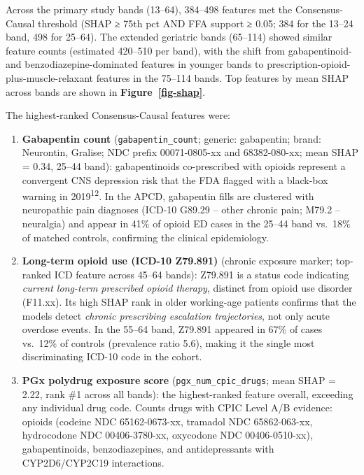 \documentclass[
  12pt,
]{book}
\begin{document}
Across the primary study bands (13--64), 384--498 features met the
Consensus-Causal threshold (SHAP ≥ 75th pct AND FFA support ≥ 0.05; 384
for the 13--24 band, 498 for 25--64). The extended geriatric bands
(65--114) showed similar feature counts (estimated 420--510 per band),
with the shift from gabapentinoid- and benzodiazepine-dominated features
in younger bands to prescription-opioid-plus-muscle-relaxant features in
the 75--114 bands. Top features by mean \textbar SHAP\textbar{} across
bands are shown in \textbf{Figure~\ref{fig-shap}}.

The highest-ranked Consensus-Causal features were:

\begin{enumerate}
\def\labelenumi{\arabic{enumi}.}
\item
  \textbf{Gabapentin count} (\texttt{gabapentin\_count}; generic:
  gabapentin; brand: Neurontin, Gralise; NDC prefix 00071-0805-xx and
  68382-080-xx; mean \textbar SHAP\textbar{} = 0.34, 25--44 band):
  gabapentinoids co-prescribed with opioids represent a convergent CNS
  depression risk that the FDA flagged with a black-box warning in
  2019\textsuperscript{12}. In the APCD, gabapentin fills are clustered
  with neuropathic pain diagnoses (ICD-10 G89.29 -- other chronic pain;
  M79.2 -- neuralgia) and appear in 41\% of opioid ED cases in the
  25--44 band vs.~18\% of matched controls, confirming the clinical
  epidemiology.
\item
  \textbf{Long-term opioid use (ICD-10 Z79.891)} (chronic exposure
  marker; top-ranked ICD feature across 45--64 bands): Z79.891 is a
  status code indicating \emph{current long-term prescribed opioid
  therapy}, distinct from opioid use disorder (F11.xx). Its high SHAP
  rank in older working-age patients confirms that the models detect
  \emph{chronic prescribing escalation trajectories}, not only acute
  overdose events. In the 55--64 band, Z79.891 appeared in 67\% of cases
  vs.~12\% of controls (prevalence ratio 5.6), making it the single most
  discriminating ICD-10 code in the cohort.
\item
  \textbf{PGx polydrug exposure score} (\texttt{pgx\_num\_cpic\_drugs};
  mean \textbar SHAP\textbar{} = 2.22, rank \#1 across all bands): the
  highest-ranked feature overall, exceeding any individual drug code.
  Counts drugs with CPIC Level A/B evidence: opioids (codeine NDC
  65162-0673-xx, tramadol NDC 65862-063-xx, hydrocodone NDC
  00406-3780-xx, oxycodone NDC 00406-0510-xx), gabapentinoids,
  benzodiazepines, and antidepressants with CYP2D6/CYP2C19 interactions.

\end{enumerate}
\end{document}

